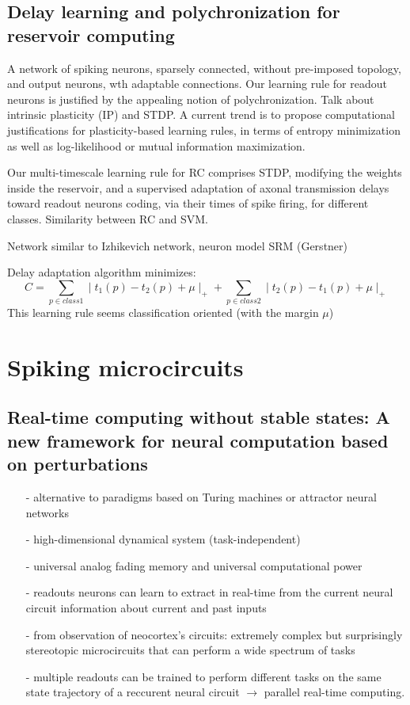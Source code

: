 \documentclass[12pt]{article}
\begin{document}
\subsection{Delay learning and polychronization for reservoir computing \cite{paugam2008delay}}
A network of spiking neurons, sparsely connected, without pre-imposed topology, and output neurons, wth adaptable connections. Our learning rule for readout neurons is justified by the appealing notion of polychronization. Talk about intrinsic plasticity (IP) and STDP. A current trend is to propose computational justifications for plasticity-based learning rules, in terms of entropy minimization as well as log-likelihood or mutual information maximization. 

Our multi-timescale learning rule for RC comprises STDP, modifying the weights inside the reservoir, and a supervised adaptation of axonal transmission delays toward readout neurons coding, via their times of spike firing, for different classes. Similarity between RC and SVM.

Network similar to Izhikevich network, neuron model SRM (Gerstner)

Delay adaptation algorithm minimizes: \begin{equation}
C = \sum_{p \in class1} \mid t_1(p) - t_2(p) + \mu \mid_{+} + \sum_{p \in class2} \mid t_2(p) - t_1(p) + \mu \mid_{+} 
\end{equation}
This learning rule seems classification oriented (with the margin $\mu$)


\section{Spiking microcircuits}
\subsection{Real-time computing without stable states: A new framework for neural computation based on perturbations \cite{maass2002real}}

\begin{itemize}
\item[-] alternative to paradigms based on Turing machines or attractor neural networks
\item[-] high-dimensional dynamical system (task-independent)
\item[-] universal analog fading memory and universal computational power
\item[-] readouts neurons can learn to extract in real-time from the current neural circuit information about current and past inputs
\item[-] from observation of neocortex's circuits: extremely complex but surprisingly stereotopic microcircuits that can perform a wide spectrum of tasks
\item[-] multiple readouts can be trained to perform different tasks on the same state trajectory of a reccurent neural circuit $\rightarrow$ parallel real-time computing.
\end{itemize}
\end{document}
